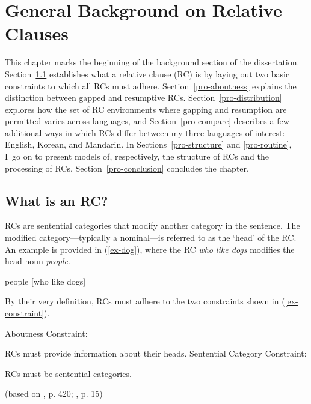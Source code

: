 
\chapter{General Background on Relative Clauses}\label{ch-properties}


This chapter marks the beginning of the background section of the dissertation. Section~\ref{pro-constraint} establishes what a relative clause (RC) is by laying out two basic constraints to which all RCs must adhere. Section~\ref{pro-aboutness} explains the distinction between gapped and resumptive RCs. Section~\ref{pro-distribution} explores how the set of RC environments where gapping and resumption are permitted varies across languages, and Section~\ref{pro-compare} describes a few additional ways in which RCs differ between my three languages of interest: English, Korean, and Mandarin. In Sections~\ref{pro-structure} and \ref{pro-routine}, I~go on to present models of, respectively, the structure of RCs and the processing of RCs. Section~\ref{pro-conclusion} concludes the chapter.

\section{What is an RC?}\label{pro-constraint}

RCs are sentential categories that modify another category in the sentence. The modified category---typically a nominal---is referred to as the `head' of the RC. An example is provided in (\ref{ex-dog}), where the RC \textit{who like dogs} modifies the head noun \textit{people}.

\ex
people [who like dogs] \label{ex-dog}
\xe

\noindent By their very definition, RCs must adhere to the two constraints shown in (\ref{ex-constraint}).

\pex \label{ex-constraint}
\a Aboutness Constraint: \par\nobreak\vspace{5pt} RCs must provide information about their heads.
\a Sentential Category Constraint: \par\nobreak\vspace{5pt} RCs must be sentential categories. \par\nobreak\vspace{5pt}
\hfill (based on \cite{kuno1976}, p. 420; \cite{ogrady2011}, p. 15)
\xe

